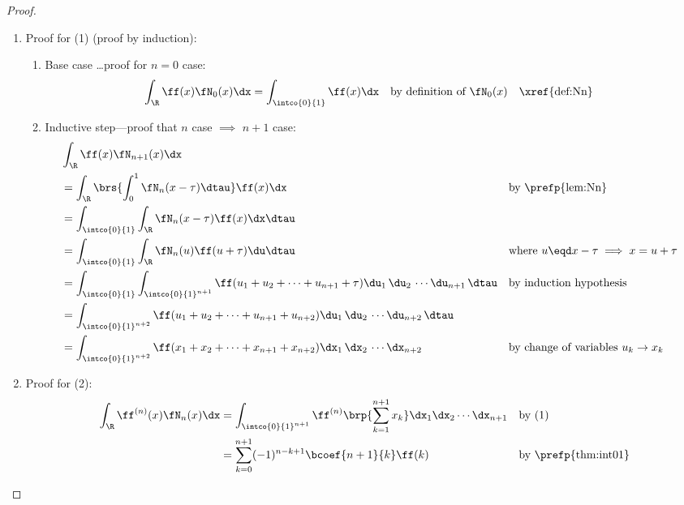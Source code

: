 \begin{proof}
\begin{enumerate}
\item Proof for (1) (proof by induction):
  \begin{enumerate}
    \item Base case \ldots proof for $n=0$ case: 
      \begin{align*}
        \int_\R \ff(x)\fN_0(x)\dx 
          &= \int_{\intco{0}{1}} \ff(x)\dx 
          && \text{by definition of $\fN_0(x)$}
          && \text{\xref{def:Nn}}
      \end{align*}

    \item Inductive step---proof that $n$ case $\implies$ $n+1$ case:
      \begin{align*}
        &\int_\R \ff(x) \fN_{n+1}(x)\dx 
        \\&= \int_\R \brs{\int_0^1\fN_n(x-\tau)\dtau} \ff(x)\dx 
          && \text{by \prefp{lem:Nn}}
        \\&= \int_\intco{0}{1}\int_\R \fN_n(x-\tau) \ff(x) \dx \dtau 
        \\&= \int_\intco{0}{1}\int_\R \fN_n(u) \ff(u+\tau) \du \dtau 
          && \text{where $u\eqd x-\tau \implies x=u+\tau$}
        \\&= \int_\intco{0}{1}\int_{\intco{0}{1}^{n+1}} \ff(u_1+u_2+\cdots+u_{n+1}+\tau) \du_1\,\du_2\,\cdots\du_{n+1}\, \dtau 
          && \text{by induction hypothesis}
        \\&= \int_{{\intco{0}{1}}^{n+2}} \ff(u_1+u_2+\cdots+u_{n+1}+u_{n+2}) \du_1\,\du_2\,\cdots\du_{n+2}\, \dtau 
        \\&= \int_{\intco{0}{1}^{n+2}} \ff(x_1+x_2+\cdots+x_{n+1}+x_{n+2}) \dx_1\,\dx_2\,\cdots\dx_{n+2}
          && \text{by change of variables $u_k\rightarrow x_k$}
      \end{align*}
  \end{enumerate}

\item Proof for (2): 
  \begin{align*}
    \int_\R \ff^{(n)}(x) \fN_n(x)\dx  
      &= \int_{\intco{0}{1}^{n+1}} \ff^{(n)}\brp{\sum_{k=1}^{n+1} x_k} \dx_1\dx_2\cdots\dx_{n+1}  
      && \text{by (1)}
    \\&= \sum_{k=0}^{n+1} (-1)^{n-k+1}\bcoef{n+1}{k}\ff(k)
      && \text{by \prefp{thm:int01}}
  \end{align*}

\end{enumerate}
\end{proof}

